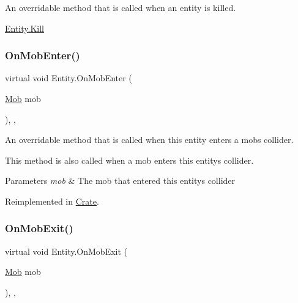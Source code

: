 An overridable method that is called when an entity is killed. 

\mbox{\hyperlink{class_entity_af02fade3c492c47394ebd4981de96b1d}{Entity.\+Kill}} \mbox{\label{class_entity_a92558812563a875ea0e6c3a781ab50bd}} 
\subsubsection{\texorpdfstring{On\+Mob\+Enter()}{OnMobEnter()}}
{\footnotesize\ttfamily virtual void Entity.\+On\+Mob\+Enter (\begin{DoxyParamCaption}\item[{\mbox{\hyperlink{class_mob}{Mob}}}]{mob }\end{DoxyParamCaption})\hspace{0.3cm}{\ttfamily [inline]}, {\ttfamily [protected]}, {\ttfamily [virtual]}}



An overridable method that is called when this entity enters a mob\textquotesingle{}s collider. 

This method is also called when a mob enters this entity\textquotesingle{}s collider. 


\begin{DoxyParams}{Parameters}
{\em mob} & The mob that entered this entity\textquotesingle{}s collider \\
\hline
\end{DoxyParams}


Reimplemented in \mbox{\hyperlink{class_crate_a31ad15231807013089177c2c4dc9ac0e}{Crate}}.

\mbox{\label{class_entity_a6d53fa0672b1a366c8e7defd2e4503a6}} 
\subsubsection{\texorpdfstring{On\+Mob\+Exit()}{OnMobExit()}}
{\footnotesize\ttfamily virtual void Entity.\+On\+Mob\+Exit (\begin{DoxyParamCaption}\item[{\mbox{\hyperlink{class_mob}{Mob}}}]{mob }\end{DoxyParamCaption})\hspace{0.3cm}{\ttfamily [inline]}, {\ttfamily [protected]}, {\ttfamily [virtual]}}



